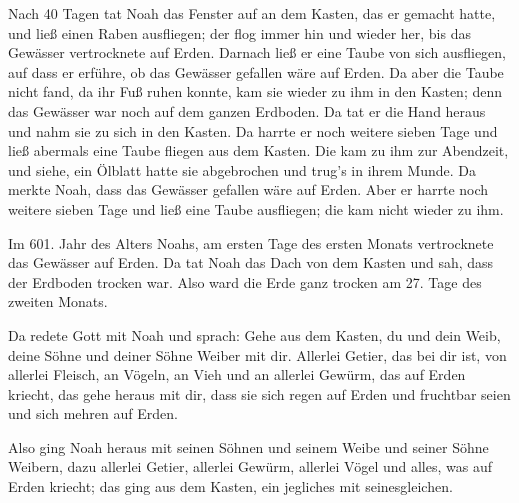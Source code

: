  Nach 40 Tagen tat Noah das Fenster auf an dem Kasten, das
er gemacht hatte,  und ließ einen Raben ausfliegen; der flog
immer hin und wieder her, bis das Gewässer vertrocknete auf Erden.
 Darnach ließ er eine Taube von sich ausfliegen, auf dass er
erführe, ob das Gewässer gefallen wäre auf Erden.  Da aber
die Taube nicht fand, da ihr Fuß ruhen konnte, kam sie wieder zu ihm in
den Kasten; denn das Gewässer war noch auf dem ganzen Erdboden. Da tat
er die Hand heraus und nahm sie zu sich in den Kasten.  Da
harrte er noch weitere sieben Tage und ließ abermals eine Taube fliegen
aus dem Kasten.  Die kam zu ihm zur Abendzeit, und siehe,
ein Ölblatt hatte sie abgebrochen und trug's in ihrem Munde. Da merkte
Noah, dass das Gewässer gefallen wäre auf Erden.  Aber er
harrte noch weitere sieben Tage und ließ eine Taube ausfliegen; die kam
nicht wieder zu ihm.

 Im 601. Jahr des Alters Noahs, am ersten Tage des ersten
Monats vertrocknete das Gewässer auf Erden. Da tat Noah das Dach von dem
Kasten und sah, dass der Erdboden trocken war.  Also ward
die Erde ganz trocken am 27. Tage des zweiten Monats.

 Da redete Gott mit Noah und sprach:  Gehe aus
dem Kasten, du und dein Weib, deine Söhne und deiner Söhne Weiber mit
dir.  Allerlei Getier, das bei dir ist, von allerlei
Fleisch, an Vögeln, an Vieh und an allerlei Gewürm, das auf Erden
kriecht, das gehe heraus mit dir, dass sie sich regen auf Erden und
fruchtbar seien und sich mehren auf Erden.

 Also ging Noah heraus mit seinen Söhnen und seinem Weibe
und seiner Söhne Weibern,  dazu allerlei Getier, allerlei
Gewürm, allerlei Vögel und alles, was auf Erden kriecht; das ging aus
dem Kasten, ein jegliches mit seinesgleichen.


